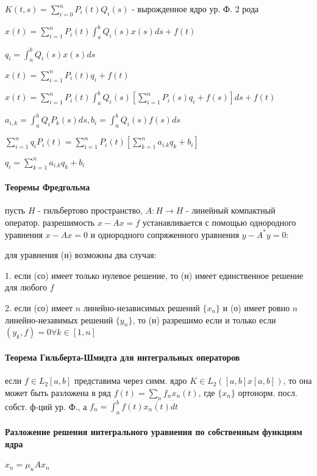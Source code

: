 \documentclass[russian,twocolumn]{article}
\begin{document}
$K(t,s) = \sum_{i=0}^n P_i(t) Q_i(s)$ - вырожденное ядро ур. Ф. 2 рода

$x(t) = \sum_{i=1}^nP_i(t) \int _a^b Q_i(s)x(s)ds + f(t)$

$q_i = \int _a^b Q_i(s)x(s)ds$

$x(t) = \sum_{i=1}^nP_i(t) q_i + f(t)$

$x(t) = \sum_{i=1}^nP_i(t) \int _a^b Q_i(s)[\sum_{i=1}^nP_i(s) q_i + f(s)]ds + f(t)$

$a_{i,k} = \int _a^b Q_i P_k(s)ds, b_i = \int_a^b Q_i(s)f(s) ds$

$\sum _{i=1}^n q_i P_i(t) = \sum _{i=1}^nP_i(t)[\sum_{k=1}^n a_{i.k} q_k + b_i]$

$q_i = \sum_{k=1}^n a_{i.k} q_k + b_i$

\paragraph{Теоремы Фредгольма}

	пусть $H$ - гильбертово пространство, $A:H \to H$ - линейный компактный оператор. разрешимость $x-Ax=f$ устанавливается с помощью однородного уравнения $x-Ax=0$ и однородного сопряженного уравнения $y-A^*y=0$:
	
	для уравнения (н) возможны два случая:
	
	1. если (со) имеет только нулевое решение, то (н) имеет единственное решение для любого $f$
	
	2. если (со) имеет $n$ линейно-независимых решений $\{x_n\}$ и (о) имеет ровно $n$ линейно-незавимых решений $\{y_n\}$, то (н) разрешимо если и только если $(y_k,f) = 0 \forall k\in[1,n]$	

\paragraph{Теорема Гильберта-Шмидта для интегральных операторов}

если $f\in L_2[a,b]$ представима через симм. ядро $K \in L_2([a,b]x[a,b])$, то она может быть разложена в ряд $f(t) = \sum_n f_n x_n (t)$, где $\{x_n\}$ ортонорм. посл. собст. ф-ций ур. Ф., а $f_n = \int _a^bf(t)\overline{x_n(t)}dt$

\paragraph{Разложение решения интегрального уравнения по собственным функциям ядра}

$x_n = \mu_n A x_n$
\end{document}
